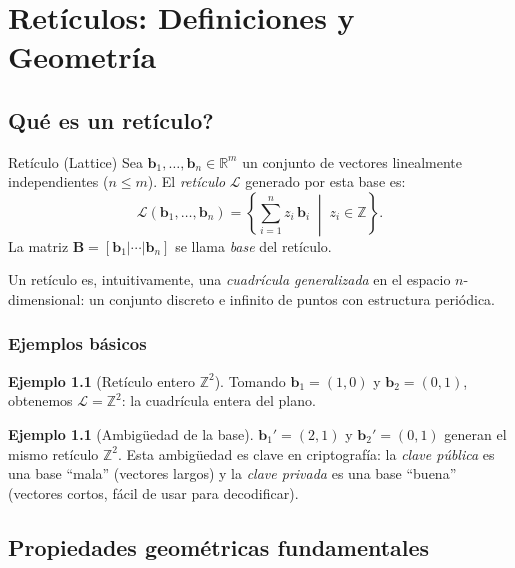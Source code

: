 \documentclass[12pt,a4paper,twoside,openright]{book}
\theoremstyle{plain}
\theoremstyle{definition}
\newtheorem{ej}[thm]{Ejemplo}
\theoremstyle{remark}
\newcommand{\Z}{\mathbb{Z}}
\newcommand{\R}{\mathbb{R}}
\newcommand{\vv}[1]{\mathbf{#1}}
\newcommand{\mm}[1]{\mathbf{#1}}
\begin{document}
\chapter{Ret\'iculos: Definiciones y Geometr\'ia}
\label{chap:reticulos}

\section{\textquestiondown Qu\'e es un ret\'iculo?}

\begin{midef}{Ret\'iculo (Lattice)}
  Sea $\vv{b}_1, \ldots, \vv{b}_n \in \R^m$ un conjunto de vectores
  linealmente independientes ($n \leq m$). El \emph{ret\'iculo}
  $\mathcal{L}$ generado por esta base es:
  \[
    \mathcal{L}(\vv{b}_1,\ldots,\vv{b}_n)
    = \left\{ \sum_{i=1}^{n} z_i \, \vv{b}_i \;\middle|\; z_i \in \Z \right\}.
  \]
  La matriz $\mm{B} = [\vv{b}_1 | \cdots | \vv{b}_n]$ se llama
  \emph{base} del ret\'iculo.
\end{midef}

Un ret\'iculo es, intuitivamente, una \emph{cuadr\'icula generalizada} en el
espacio $n$-dimensional: un conjunto discreto e infinito de puntos con
estructura peri\'odica.

\subsection{Ejemplos b\'asicos}

\begin{ej}[Ret\'iculo entero $\Z^2$]
  Tomando $\vv{b}_1 = (1,0)$ y $\vv{b}_2 = (0,1)$, obtenemos
  $\mathcal{L} = \Z^2$: la cuadr\'icula entera del plano.
\end{ej}

\begin{ej}[Ambig\"uedad de la base]
  $\vv{b}_1' = (2,1)$ y $\vv{b}_2' = (0,1)$ generan el mismo ret\'iculo
  $\Z^2$. Esta ambig\"uedad es clave en criptograf\'ia: la \emph{clave
  p\'ublica} es una base ``mala'' (vectores largos) y la \emph{clave
  privada} es una base ``buena'' (vectores cortos, f\'acil de usar para
  decodificar).
\end{ej}

\section{Propiedades geom\'etricas fundamentales}
\end{document}
